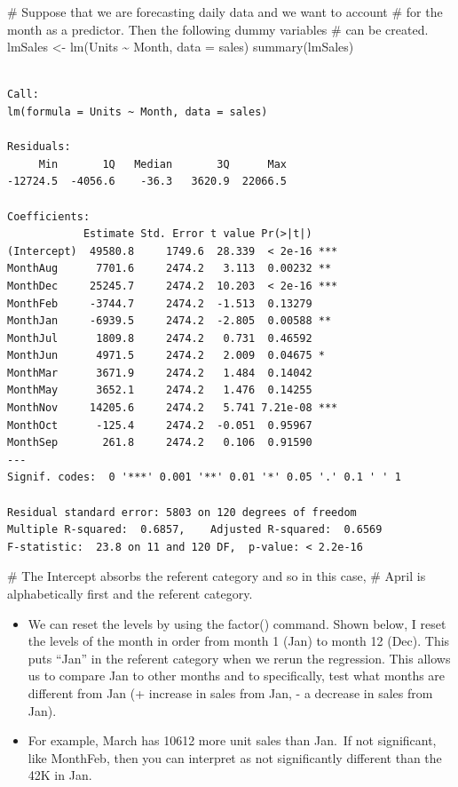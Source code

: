 \documentclass[
  letterpaper,
  DIV=11,
  numbers=noendperiod]{scrreprt}
\newenvironment{Shaded}{\begin{snugshade}}{\end{snugshade}}
\newcommand{\AttributeTok}[1]{\textcolor[rgb]{0.40,0.45,0.13}{#1}}
\newcommand{\CommentTok}[1]{\textcolor[rgb]{0.37,0.37,0.37}{#1}}
\newcommand{\FunctionTok}[1]{\textcolor[rgb]{0.28,0.35,0.67}{#1}}
\newcommand{\NormalTok}[1]{\textcolor[rgb]{0.00,0.23,0.31}{#1}}
\newcommand{\OtherTok}[1]{\textcolor[rgb]{0.00,0.23,0.31}{#1}}
\newcommand{\SpecialCharTok}[1]{\textcolor[rgb]{0.37,0.37,0.37}{#1}}
\providecommand{\tightlist}{%
  \setlength{\itemsep}{0pt}\setlength{\parskip}{0pt}}\usepackage{longtable,booktabs,array}
\begin{document}
\begin{Shaded}
\begin{Highlighting}[]
\CommentTok{\# Suppose that we are forecasting daily data and we want to account}
\CommentTok{\# for the month as a predictor.  Then the following dummy variables}
\CommentTok{\# can be created.}
\NormalTok{lmSales }\OtherTok{\textless{}{-}} \FunctionTok{lm}\NormalTok{(Units }\SpecialCharTok{\textasciitilde{}}\NormalTok{ Month, }\AttributeTok{data =}\NormalTok{ sales)}
\FunctionTok{summary}\NormalTok{(lmSales)}
\end{Highlighting}
\end{Shaded}

\begin{verbatim}

Call:
lm(formula = Units ~ Month, data = sales)

Residuals:
     Min       1Q   Median       3Q      Max 
-12724.5  -4056.6    -36.3   3620.9  22066.5 

Coefficients:
            Estimate Std. Error t value Pr(>|t|)    
(Intercept)  49580.8     1749.6  28.339  < 2e-16 ***
MonthAug      7701.6     2474.2   3.113  0.00232 ** 
MonthDec     25245.7     2474.2  10.203  < 2e-16 ***
MonthFeb     -3744.7     2474.2  -1.513  0.13279    
MonthJan     -6939.5     2474.2  -2.805  0.00588 ** 
MonthJul      1809.8     2474.2   0.731  0.46592    
MonthJun      4971.5     2474.2   2.009  0.04675 *  
MonthMar      3671.9     2474.2   1.484  0.14042    
MonthMay      3652.1     2474.2   1.476  0.14255    
MonthNov     14205.6     2474.2   5.741 7.21e-08 ***
MonthOct      -125.4     2474.2  -0.051  0.95967    
MonthSep       261.8     2474.2   0.106  0.91590    
---
Signif. codes:  0 '***' 0.001 '**' 0.01 '*' 0.05 '.' 0.1 ' ' 1

Residual standard error: 5803 on 120 degrees of freedom
Multiple R-squared:  0.6857,    Adjusted R-squared:  0.6569 
F-statistic:  23.8 on 11 and 120 DF,  p-value: < 2.2e-16
\end{verbatim}

\begin{Shaded}
\begin{Highlighting}[]
\CommentTok{\# The Intercept absorbs the referent category and so in this case,}
\CommentTok{\# April is alphabetically first and the referent category.}
\end{Highlighting}
\end{Shaded}

\begin{itemize}
\tightlist
\item
  We can reset the levels by using the factor() command. Shown below, I
  reset the levels of the month in order from month 1 (Jan) to month 12
  (Dec). This puts ``Jan'' in the referent category when we rerun the
  regression. This allows us to compare Jan to other months and to
  specifically, test what months are different from Jan (+ increase in
  sales from Jan, - a decrease in sales from Jan).
\item
  For example, March has 10612 more unit sales than Jan.~If not
  significant, like MonthFeb, then you can interpret as not
  significantly different than the 42K in Jan.
\end{itemize}
\end{document}
